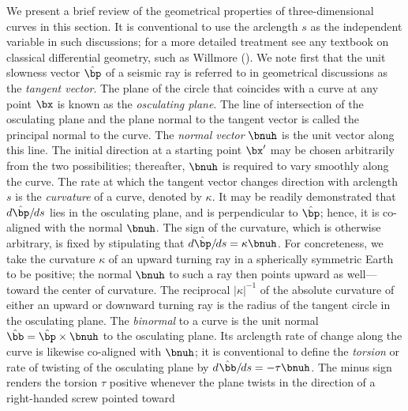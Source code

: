 We present a brief review of the geometrical
properties of three-dimensional curves in this section.
It is conventional to use the arclength $s$
as the independent variable in such discussions;
for a more detailed treatment see any textbook on
classical differential geometry, such as Willmore
(\citeyear{willmore59}).  We note first that the
unit slowness vector $\hat{\bp}$ of a seismic ray
is referred to in geometrical discussions as the
{\em tangent vector\/}.  The plane of the circle
%
%
that coincides with a curve at any point $\bx$ is
known as the {\em osculating plane\/}.
%
The line of intersection of the osculating
plane and the plane normal to the tangent vector
is called the principal normal to the curve.  The {\em normal
vector\/} $\bnuh$ is the unit vector along this line.
%
%
The initial direction at a starting point $\bx'$ may
be chosen arbitrarily from the two possibilities;
thereafter, $\bnuh$ is required to vary smoothly along
the curve.  The rate at which the tangent vector
changes direction with arclength $s$ is the
{\em curvature\/} of a curve, denoted by $\kappa$.
%
It may be readily demonstrated that
$d\hat{\bp}/\hspace{-0.3 mm}ds$ lies in the osculating plane,
and is perpendicular to $\hat{\bp}$; hence, it is co-aligned
with the normal $\bnuh$.  The sign of the curvature, which
is otherwise arbitrary, is fixed by stipulating that
$d\hat{\bp}/\hspace{-0.3 mm}ds=\kappa\bnuh$.  For concreteness,
we take the curvature $\kappa$
of an upward turning ray in a spherically symmetric Earth
to be positive; the normal $\bnuh$ to such
a ray then points upward as well---toward the center of curvature. 
The reciprocal $|\kappa|^{-1}$ of the absolute curvature
of either an upward or downward turning ray is the
radius of the tangent circle in the osculating plane.
The {\em binormal\/} to a curve is the unit normal
%
$\hat{\bb}=\hat{\bp}\times\bnuh$ to the
osculating plane.  Its arclength rate of change
along the curve is likewise co-aligned with
$\bnuh$; it is conventional to define the
{\em torsion\/} or rate of twisting of the
%
osculating plane by
$d\hspace{0.2 mm}\hat{\bb}/\hspace{-0.3 mm}ds=-\tau\bnuh$.
The minus sign renders the torsion $\tau$
positive whenever the plane twists in
the direction of a right-handed screw pointed toward
